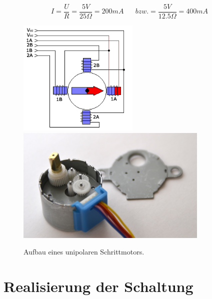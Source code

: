 \documentclass[11pt, titlepage]{report}
\begin{document}
				\begin{equation}
					\label{eq:StromMinMax}
					I=\frac{U}{R}=\frac{5V}{25\Omega} = 200mA \hspace{20pt} bzw. = \frac{5V}{12.5\Omega} = 400mA
				\end{equation}


				\begin{figure}[htbp]
					\centering
						{\includegraphics[height=15em]{./img/motor_stepper_unipolar.png}}
						{\includegraphics[height=15em]{./img/gear.png}}
					\caption{ Aufbau eines unipolaren Schrittmotors.
					\label{fig:imgMotor}}
				\end{figure}
		\newpage
		\section{Realisierung der Schaltung}
\end{document}
